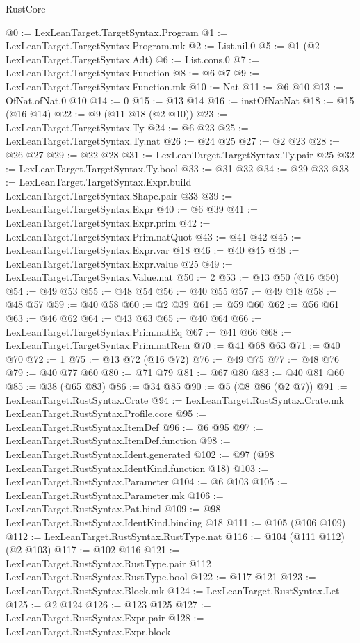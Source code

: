 \begin{lexlean}{RustCore}
\begin{coremodule}
@0 := LexLeanTarget.TargetSyntax.Program
@1 := LexLeanTarget.TargetSyntax.Program.mk
@2 := List.nil.{0}
@5 := @1 (@2 LexLeanTarget.TargetSyntax.Adt)
@6 := List.cons.{0}
@7 := LexLeanTarget.TargetSyntax.Function
@8 := @6 @7
@9 := LexLeanTarget.TargetSyntax.Function.mk
@10 := Nat
@11 := @6 @10
@13 := OfNat.ofNat.{0} @10
@14 := 0
@15 := @13 @14
@16 := instOfNatNat
@18 := @15 (@16 @14)
@22 := @9 (@11 @18 (@2 @10))
@23 := LexLeanTarget.TargetSyntax.Ty
@24 := @6 @23
@25 := LexLeanTarget.TargetSyntax.Ty.nat
@26 := @24 @25
@27 := @2 @23
@28 := @26 @27
@29 := @22 @28
@31 := LexLeanTarget.TargetSyntax.Ty.pair @25
@32 := LexLeanTarget.TargetSyntax.Ty.bool
@33 := @31 @32
@34 := @29 @33
@38 := LexLeanTarget.TargetSyntax.Expr.build LexLeanTarget.TargetSyntax.Shape.pair @33
@39 := LexLeanTarget.TargetSyntax.Expr
@40 := @6 @39
@41 := LexLeanTarget.TargetSyntax.Expr.prim
@42 := LexLeanTarget.TargetSyntax.Prim.natQuot
@43 := @41 @42
@45 := LexLeanTarget.TargetSyntax.Expr.var @18
@46 := @40 @45
@48 := LexLeanTarget.TargetSyntax.Expr.value @25
@49 := LexLeanTarget.TargetSyntax.Value.nat
@50 := 2
@53 := @13 @50 (@16 @50)
@54 := @49 @53
@55 := @48 @54
@56 := @40 @55
@57 := @49 @18
@58 := @48 @57
@59 := @40 @58
@60 := @2 @39
@61 := @59 @60
@62 := @56 @61
@63 := @46 @62
@64 := @43 @63
@65 := @40 @64
@66 := LexLeanTarget.TargetSyntax.Prim.natEq
@67 := @41 @66
@68 := LexLeanTarget.TargetSyntax.Prim.natRem
@70 := @41 @68 @63
@71 := @40 @70
@72 := 1
@75 := @13 @72 (@16 @72)
@76 := @49 @75
@77 := @48 @76
@79 := @40 @77 @60
@80 := @71 @79
@81 := @67 @80
@83 := @40 @81 @60
@85 := @38 (@65 @83)
@86 := @34 @85
@90 := @5 (@8 @86 (@2 @7))
@91 := LexLeanTarget.RustSyntax.Crate
@94 := LexLeanTarget.RustSyntax.Crate.mk LexLeanTarget.RustSyntax.Profile.core
@95 := LexLeanTarget.RustSyntax.ItemDef
@96 := @6 @95
@97 := LexLeanTarget.RustSyntax.ItemDef.function
@98 := LexLeanTarget.RustSyntax.Ident.generated
@102 := @97 (@98 LexLeanTarget.RustSyntax.IdentKind.function @18)
@103 := LexLeanTarget.RustSyntax.Parameter
@104 := @6 @103
@105 := LexLeanTarget.RustSyntax.Parameter.mk
@106 := LexLeanTarget.RustSyntax.Pat.bind
@109 := @98 LexLeanTarget.RustSyntax.IdentKind.binding @18
@111 := @105 (@106 @109)
@112 := LexLeanTarget.RustSyntax.RustType.nat
@116 := @104 (@111 @112) (@2 @103)
@117 := @102 @116
@121 := LexLeanTarget.RustSyntax.RustType.pair @112 LexLeanTarget.RustSyntax.RustType.bool
@122 := @117 @121
@123 := LexLeanTarget.RustSyntax.Block.mk
@124 := LexLeanTarget.RustSyntax.Let
@125 := @2 @124
@126 := @123 @125
@127 := LexLeanTarget.RustSyntax.Expr.pair
@128 := LexLeanTarget.RustSyntax.Expr.block

\end{coremodule}
\end{lexlean}
